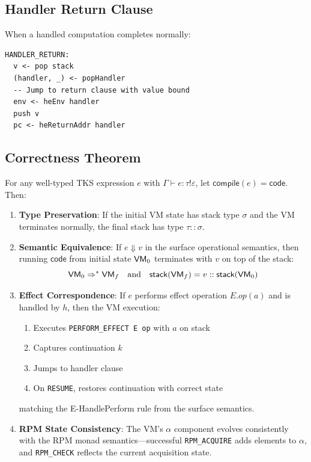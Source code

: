 \subsection{Handler Return Clause}
\label{subsec:handler-return}

\begin{definition}
\label{def:handler-return-semantics}
When a handled computation completes normally:
\begin{verbatim}
HANDLER_RETURN:
  v <- pop stack
  (handler, _) <- popHandler
  -- Jump to return clause with value bound
  env <- heEnv handler
  push v
  pc <- heReturnAddr handler
\end{verbatim}
\end{definition}

\subsection{Correctness Theorem}
\label{subsec:vm-correctness}

\begin{theorem}
\label{thm:vm-correctness-v73}
For any well-typed TKS expression $e$ with $\Gamma \vdash e : \tau \mathbin{!} \varepsilon$, let $\mathsf{compile}(e) = \mathsf{code}$. Then:

\begin{enumerate}
  \item \textbf{Type Preservation}: If the initial VM state has stack type $\sigma$ and the VM terminates normally, the final stack has type $\tau :: \sigma$.

  \item \textbf{Semantic Equivalence}: If $e \Downarrow v$ in the surface operational semantics, then running $\mathsf{code}$ from initial state $\mathsf{VM}_0$ terminates with $v$ on top of the stack:
  \[
  \mathsf{VM}_0 \Rightarrow^* \mathsf{VM}_f \quad \text{and} \quad \mathsf{stack}(\mathsf{VM}_f) = v :: \mathsf{stack}(\mathsf{VM}_0)
  \]

  \item \textbf{Effect Correspondence}: If $e$ performs effect operation $E.\mathit{op}(a)$ and is handled by $h$, then the VM execution:
  \begin{enumerate}
    \item Executes \texttt{PERFORM\_EFFECT E op} with $a$ on stack
    \item Captures continuation $k$
    \item Jumps to handler clause
    \item On \texttt{RESUME}, restores continuation with correct state
  \end{enumerate}
  matching the E-HandlePerform rule from the surface semantics.

  \item \textbf{RPM State Consistency}: The VM's $\alpha$ component evolves consistently with the RPM monad semantics---successful \texttt{RPM\_ACQUIRE} adds elements to $\alpha$, and \texttt{RPM\_CHECK} reflects the current acquisition state.
\end{enumerate}
\end{theorem}


